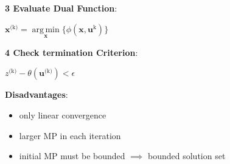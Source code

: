 \documentclass[english]{latex4ei/latex4ei_sheet}
\DeclareMathOperator*{\argmin}{arg\,min}
\begin{document}
\begin{sectionbox}
	\textbf{ 3 Evaluate Dual Function}:
	\vspace{0.3em}
	\begin{center}
		$\bm{x}^{\text{(k)}} = \argmin\limits_{\bm{x}}\{ \phi(\bm{x}, \bm{u}^{\text{k}}) \}$
	\end{center}
	
	\textbf{ 4 Check termination Criterion}:
	\vspace{0.3em}
	\begin{center}
		$z^{\text{(k)}} - \theta(\bm{u}^{\text{(k)}}) < \epsilon$
	\end{center}
	
	\textbf{Disadvantages}:
	\begin{itemize}
		\item only linear convergence
		\item larger MP in each iteration
		\item initial MP must be bounded $\implies$ bounded solution set
	\end{itemize}
	
\end{sectionbox}
\end{document}
